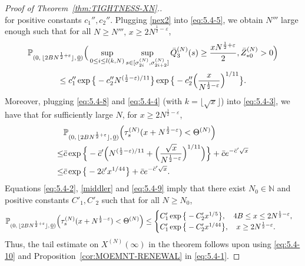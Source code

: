 \documentclass[11pt, reqno]{article}
\DeclarePairedDelimiter\autobracket{(}{)}
\newcommand{\br}[1]{\autobracket*{#1}}
\numberwithin{equation}{section}
\numberwithin{theorem}{section}
\begin{document}
\begin{proof}[Proof of Theorem~\ref{thm:TIGHTNESS-XN}.]
\begin{equation}
\end{equation}
for positive constants $c_1'', c_2''$.
Plugging \eqref{nex2} into \eqref{eq:5.4-5}, we obtain $N'''$ large enough such that for all $N\geq N''', \, x\geq 2N^{\frac{1}{2}-\varepsilon}$,
\begin{multline}\label{eq:5.4-8}
    \mathbb{P}_{(0, \, \lfloor 2BN^{\frac{1}{2}+\varepsilon} \rfloor, \,\underline{0})}\Big(\sup_{0\leq i\leq l(k,N)}\sup_{s\in [\sigma^{(N)}_{2i},\sigma^{(N)}_{2i+2}]}\Bar{Q}_3^{(N)}(s)\geq \frac{xN^{\frac{1}{2}+\varepsilon}}{2},\Bar{Z}^{(N)}_{*0}>0\Big)\\
   \leq c_1''\exp \big\{-c_2''N^{(\frac{1}{2}-\varepsilon)/11}\big\}\exp\big\{-c''_2\Big(\frac{x}{N^{\frac{1}{2}-\varepsilon}}\Big)^{1/11}\big\}.
\end{multline}
Moreover, plugging \eqref{eq:5.4-8} and \eqref{eq:5.4-4} (with $k = \lfloor \sqrt{x} \rfloor$) into \eqref{eq:5.4-3}, we have that for sufficiently large $N$, for $x\geq 2N^{\frac{1}{2}-\varepsilon}$,
\begin{align}\label{eq:5.4-9}
    &\mathbb{P}_{(0, \, \lfloor 2BN^{\frac{1}{2}+\varepsilon} \rfloor, \,\underline{0})}\br{\tau^{(N)}_s(x+N^{\frac{1}{2}-\varepsilon})<\Theta^{(N)}}\nonumber\\
    \leq & \bar{c}\exp \Big\{-\bar{c}'\Big(N^{(\frac{1}{2}-\varepsilon)/11}+\Big(\frac{\sqrt{x}}{N^{\frac{1}{2}-\varepsilon}}\Big)^{1/11}\Big)\Big\}+\bar{c}e^{-\bar{c}'\sqrt{x}}\nonumber\\
    \leq & \bar{c}\exp \big\{-2\bar{c}'x^{1/44}\big\}+\bar{c}e^{-\bar{c}'\sqrt{x}}.
\end{align}
Equations \eqref{eq:5.4-2}, \eqref{middler} and \eqref{eq:5.4-9} imply that there exist $N_0 \in \mathbb{N}$ and positive constants $C'_1, C'_2$ such that for all $N\geq N_0$,
\begin{equation}\label{eq:5.4-10}
    \mathbb{P}_{(0, \, \lfloor 2BN^{\frac{1}{2}+\varepsilon} \rfloor, \,\underline{0})}\br{\tau^{(N)}_s(x+N^{\frac{1}{2}-\varepsilon})<\Theta^{(N)} } \le \begin{cases} C'_1\exp\big\{-C'_2x^{1/5}\big\},\quad 4B\leq x\leq 2N^{\frac{1}{2}-\varepsilon},\\
    C'_1\exp \big\{-C'_2x^{1/44}\big\},\quad x\geq 2N^{\frac{1}{2}-\varepsilon}.
    \end{cases}
\end{equation}
Thus, the tail estimate on $X^{(N)}(\infty)$ in the theorem follows upon using \eqref{eq:5.4-10} and Proposition~\ref{cor:MOEMNT-RENEWAL} in \eqref{eq:5.4-1}.




\end{proof}
\end{document}
